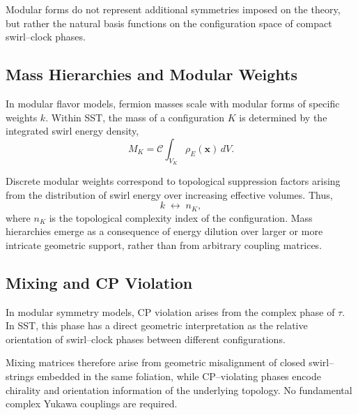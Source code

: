 \documentclass[11pt]{article}
\begin{document}
            Modular forms do not represent additional symmetries imposed on the theory, but
            rather the natural basis functions on the configuration space of compact
            swirl--clock phases.

        \subsection{Mass Hierarchies and Modular Weights}

            In modular flavor models, fermion masses scale with modular forms of specific
            weights $k$.
            Within SST, the mass of a configuration $K$ is determined by the integrated
            swirl energy density,
            \begin{equation}
                M_K = \mathcal{C}\int_{V_K}\rho_{\!E}(\mathbf{x})\,dV .
            \end{equation}

            Discrete modular weights correspond to topological suppression factors arising
            from the distribution of swirl energy over increasing effective volumes.
            Thus,
            \begin{equation}
                k
                \;\longleftrightarrow\;
                n_K ,
            \end{equation}
            where $n_K$ is the topological complexity index of the configuration.
            Mass hierarchies emerge as a consequence of energy dilution over larger or more
            intricate geometric support, rather than from arbitrary coupling matrices.

        \subsection{Mixing and CP Violation}

            In modular symmetry models, CP violation arises from the complex phase of $\tau$.
            In SST, this phase has a direct geometric interpretation as the relative
            orientation of swirl--clock phases between different configurations.

            Mixing matrices therefore arise from geometric misalignment of closed
            swirl--strings embedded in the same foliation, while CP--violating phases encode
            chirality and orientation information of the underlying topology.
            No fundamental complex Yukawa couplings are required.
\end{document}
